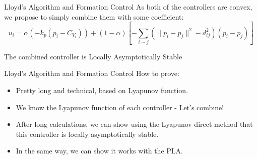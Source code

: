\documentclass[t]{beamer}
\newcommand{\norm}[1]{\lVert #1 \rVert}
\begin{document}
\begin{frame}[label=lloydsandformation2]{Lloyd's Algorithm and Formation Control}
As both of the controllers are convex, we propose to simply combine them with some coefficient:\\
\begin{equation}
    u_{i} = \alpha \left(-k_{p}\left( p_i -C_{V_{i}} \right)\right) +
    \left( 1-\alpha \right)\left[-\sum_{i \sim j} \left( \norm{p_{i} - p_{j}}^{2} - d_{ij}^2 \right) \left( p_{i} - p_{j} \right)  \right] 
    \label{Combined Controller}
\end{equation}\pause
\begin{theorem}
The combined controller is Locally Asymptotically Stable
\end{theorem}
\end{frame}

\begin{frame}[label=lloydsandformation3]{Lloyd's Algorithm and Formation Control}
How to prove:
\begin{itemize}
\item Pretty long and technical, based on Lyapunov function.
\item We know the Lyapunov function of each controller - Let's combine!
\item After long calculations, we can show using the Lyapunov direct method that this controller is locally asymptotically stable.
\item In the same way, we can show it works with the PLA.
\end{itemize}
\end{frame}
\end{document}
